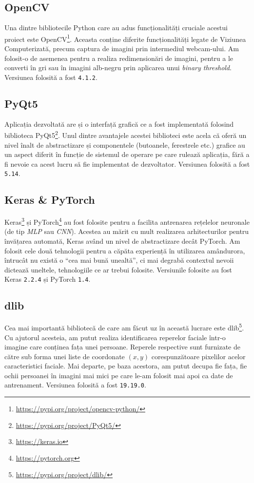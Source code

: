 \subsection{OpenCV}
Una dintre bibliotecile Python care au adus funcționalități cruciale acestui proiect este OpenCV\footnote{\url{https://pypi.org/project/opencv-python/}}.
Aceasta conține diferite funcționalități legate de Viziunea Computerizată, precum captura de imagini prin intermediul webcam-ului.
Am folosit-o de asemenea pentru a realiza redimensionări de imagini, pentru a le converti în gri sau în imagini alb-negru prin aplicarea unui \emph{binary threshold}.
Versiunea folosită a fost \lstinline{4.1.2}.

\subsection{PyQt5}
Aplicația dezvoltată are și o interfață grafică ce a fost implementată folosind biblioteca PyQt5\footnote{\url{https://pypi.org/project/PyQt5/}}.
Unul dintre avantajele acestei biblioteci este acela că oferă un nivel înalt de abstractizare și componentele (butoanele, ferestrele etc.) grafice au un aspect diferit în funcție de sistemul de operare pe care rulează aplicația, fără a fi nevoie ca acest lucru să fie implementat de dezvoltator.
Versiunea folosită a fost \lstinline{5.14}.

\subsection{Keras \& PyTorch}
Keras\footnote{\url{https://keras.io}} și PyTorch\footnote{\url{https://pytorch.org}} au fost folosite pentru a facilita antrenarea rețelelor neuronale (de tip \emph{MLP} sau \emph{CNN}).
Acestea au mărit cu mult realizarea arhitecturilor pentru învățarea automată, Keras având un nivel de abstractizare decât PyTorch.
Am folosit cele două tehnologii pentru a căpăta experiență în utilizarea amândurora, întrucât nu există o ``cea mai bună unealtă'', ci mai degrabă contextul nevoii dictează uneltele, tehnologiile ce ar trebui folosite.
Versiunile folosite au fost Keras \lstinline{2.2.4} și PyTorch \lstinline{1.4}.

\subsection{dlib}
Cea mai importantă bibliotecă de care am făcut uz în această lucrare este dlib\footnote{\url{https://pypi.org/project/dlib/}}.
Cu ajutorul acesteia, am putut realiza identificarea reperelor faciale într-o imagine care conținea fața unei persoane.
Reperele respective sunt furnizate de către sub forma unei liste de coordonate $(x, y)$ corespunzătoare pixelilor acelor caracteristici faciale.
Mai departe, pe baza acestora, am putut decupa fie fața, fie ochii persoanei în imagini mai mici pe care le-am folosit mai apoi ca date de antrenament.
Versiunea folosită a fost \lstinline{19.19.0}.

